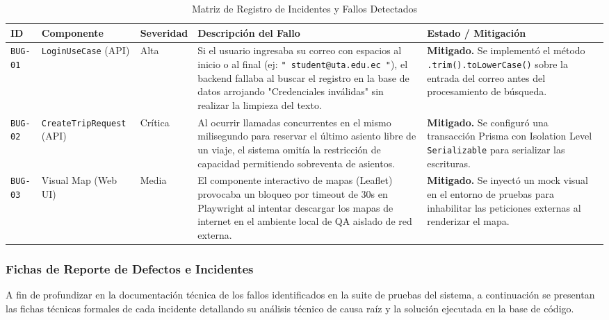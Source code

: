 \documentclass{article}
\begin{document}
\begin{table}[H]
\centering
\small
\caption{Matriz de Registro de Incidentes y Fallos Detectados}
\begin{tabularx}{\linewidth}{p{1.5cm} p{2cm} p{2cm} X p{3cm}}
\toprule
\textbf{ID} & \textbf{Componente} & \textbf{Severidad} & \textbf{Descripción del Fallo} & \textbf{Estado / Mitigación} \\
\midrule
\texttt{BUG-01} & \texttt{LoginUseCase} (API) & Alta & Si el usuario ingresaba su correo con espacios al inicio o al final (ej: \texttt{" student@uta.edu.ec "}), el backend fallaba al buscar el registro en la base de datos arrojando "Credenciales inválidas" sin realizar la limpieza del texto. & \textbf{Mitigado.} Se implementó el método \texttt{.trim().toLowerCase()} sobre la entrada del correo antes del procesamiento de búsqueda. \\
\midrule
\texttt{BUG-02} & \texttt{CreateTripRequest} (API) & Crítica & Al ocurrir llamadas concurrentes en el mismo milisegundo para reservar el último asiento libre de un viaje, el sistema omitía la restricción de capacidad permitiendo sobreventa de asientos. & \textbf{Mitigado.} Se configuró una transacción Prisma con Isolation Level \texttt{Serializable} para serializar las escrituras. \\
\midrule
\texttt{BUG-03} & Visual Map (Web UI) & Media & El componente interactivo de mapas (Leaflet) provocaba un bloqueo por timeout de 30s en Playwright al intentar descargar los mapas de internet en el ambiente local de QA aislado de red externa. & \textbf{Mitigado.} Se inyectó un mock visual en el entorno de pruebas para inhabilitar las peticiones externas al renderizar el mapa. \\
\bottomrule
\end{tabularx}
\end{table}

\subsubsection{Fichas de Reporte de Defectos e Incidentes}

A fin de profundizar en la documentación técnica de los fallos identificados en la suite de pruebas del sistema, a continuación se presentan las fichas técnicas formales de cada incidente detallando su análisis técnico de causa raíz y la solución ejecutada en la base de código.
\end{document}
